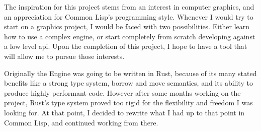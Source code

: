 
The inspiration for this project stems from an interest in computer graphics,
and an appreciation for Common Lisp's programming style.
Whenever I would try to start on a graphics project,
I would be faced with two possibilities.
Either learn how to use a complex engine,
or start completely from scratch developing against a low level \ac{api}.
Upon the completion of this project,
I hope to have a tool that will allow me to pursue those interests.

Originally the Engine was going to be written in Rust,
because of its many stated benefits like a strong type system,
borrow and move semantics,
and its ability to produce highly performant code.
However after some months working on the project,
Rust's type system proved too rigid for the flexibility and freedom I was looking for.
At that point,
I decided to rewrite what I had up to that point in Common Lisp,
and continued working from there.
